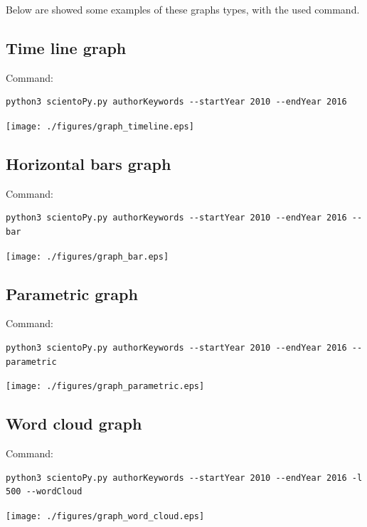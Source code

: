 \documentclass[10pt,letterpaper]{article}
\begin{document}
Below are showed some examples of these graphs types, with the used command.

\subsection{Time line graph}
Command: 
\begin{verbatim}
python3 scientoPy.py authorKeywords --startYear 2010 --endYear 2016
\end{verbatim}

\begin{center}
	\texttt{[image: ./figures/graph\_timeline.eps]}
\end{center}


\subsection{Horizontal bars graph}
Command: 
\begin{verbatim}
python3 scientoPy.py authorKeywords --startYear 2010 --endYear 2016 --bar
\end{verbatim}

\begin{center}
	\texttt{[image: ./figures/graph\_bar.eps]}
\end{center}

\newpage
\subsection{Parametric graph}
Command: 
\begin{verbatim}
python3 scientoPy.py authorKeywords --startYear 2010 --endYear 2016 --parametric
\end{verbatim}

\begin{center}
	\texttt{[image: ./figures/graph\_parametric.eps]}
\end{center}


\subsection{Word cloud graph}
Command: 
\begin{verbatim}
python3 scientoPy.py authorKeywords --startYear 2010 --endYear 2016 -l 500 --wordCloud
\end{verbatim}

\begin{center}
	\texttt{[image: ./figures/graph\_word\_cloud.eps]}
\end{center}
\end{document}
